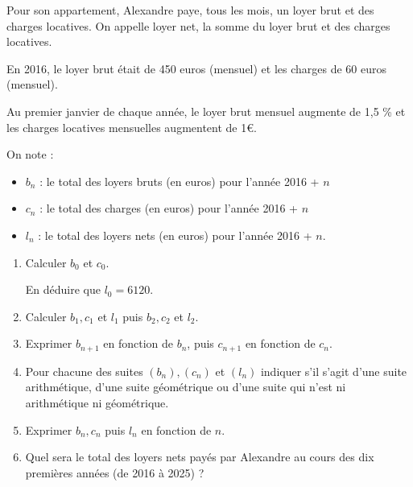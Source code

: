
%

Pour son appartement, Alexandre paye, tous les mois, un loyer brut et des charges locatives. On appelle loyer net, la somme du loyer brut et des charges locatives.
\par
En 2016, le loyer brut était de 450 euros (mensuel) et les charges de 60 euros (mensuel).
\par
Au premier janvier de chaque année, le loyer brut mensuel augmente de 1,5 \% et les charges locatives mensuelles augmentent de 1€.
\par
On note :
\begin{itemize}
     \item
     $b_n$ : le total des loyers bruts (en euros) pour l'année 2016 + $n$
     \item
     $c_n$ : le total des charges (en euros) pour l'année 2016 + $n$
     \item
     $l_n$ : le total des loyers nets (en euros) pour l'année 2016 + $n$.
\end{itemize}
\begin{enumerate}
     \item
     Calculer $b_0$ et $c_0$.
     \par
     En déduire que $l_0=6120$.
     \item
     Calculer $b_1, c_1$ et $l_1$ puis $b_2, c_2$ et $l_2$.
     \item
     Exprimer $b_{n+1}$ en fonction de $b_n$, puis $c_{n+1}$ en fonction de $c_n$.
     \item
     Pour chacune des suites $(b_n), (c_n)$ et $(l_n)$ indiquer s'il s'agit d'une suite arithmétique, d'une suite géométrique ou d'une suite qui n'est ni arithmétique ni géométrique.
     \item
     Exprimer $b_n, c_n$ puis $l_n$ en fonction de $n$.
     \item
     Quel sera le total des loyers nets payés par Alexandre au cours des dix premières années (de 2016 à 2025) ?
\end{enumerate}
